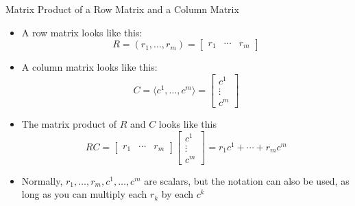 \documentclass[usenames,dvipsnames,10pt]{beamer}
\begin{document}
\begin{frame}
  {Matrix Product of a Row Matrix and a Column Matrix}

  \begin{itemize}
  \item A row matrix looks like this:
    \[
      R = (r_1, \dots, r_m) = \begin{bmatrix} r_1 & \cdots & r_m\end{bmatrix}
    \]
  \item A column matrix looks like this:
    \[
      C = \langle c^1, \dots, c^m\rangle = \begin{bmatrix} c^1\\ \vdots \\ c^m\end{bmatrix}
    \]
  \item The matrix product of $R$ and $C$ looks like this
    \[
      RC = \begin{bmatrix} r_1 & \cdots & r_m\end{bmatrix}\begin{bmatrix} c^1\\ \vdots \\ c^m\end{bmatrix} = r_1c^1 + \cdots + r_mc^m
    \]
  \item Normally, $r_1, \dots, r_m, c^1, \dots, c^m$ are scalars, but the notation can also be used, as long as you can multiply each $r_k$ by each $c^k$
  \end{itemize}
\end{frame}
\end{document}

